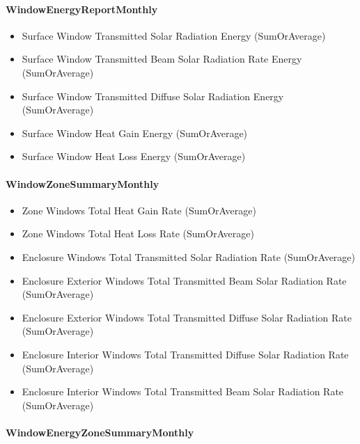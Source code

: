 \paragraph{WindowEnergyReportMonthly}\label{windowenergyreportmonthly}

\begin{itemize}
\item
  Surface Window Transmitted Solar Radiation Energy (SumOrAverage)
\item
  Surface Window Transmitted Beam Solar Radiation Rate Energy (SumOrAverage)
\item
  Surface Window Transmitted Diffuse Solar Radiation Energy (SumOrAverage)
\item
  Surface Window Heat Gain Energy (SumOrAverage)
\item
  Surface Window Heat Loss Energy (SumOrAverage)
\end{itemize}

\paragraph{WindowZoneSummaryMonthly}\label{windowzonesummarymonthly}

\begin{itemize}
\item
  Zone Windows Total Heat Gain Rate (SumOrAverage)
\item
  Zone Windows Total Heat Loss Rate (SumOrAverage)
\item
  Enclosure Windows Total Transmitted Solar Radiation Rate (SumOrAverage)
\item
  Enclosure Exterior Windows Total Transmitted Beam Solar Radiation Rate (SumOrAverage)
\item
  Enclosure Exterior Windows Total Transmitted Diffuse Solar Radiation Rate (SumOrAverage)
\item
  Enclosure Interior Windows Total Transmitted Diffuse Solar Radiation Rate (SumOrAverage)
\item
  Enclosure Interior Windows Total Transmitted Beam Solar Radiation Rate (SumOrAverage)
\end{itemize}

\paragraph{WindowEnergyZoneSummaryMonthly}\label{windowenergyzonesummarymonthly}


